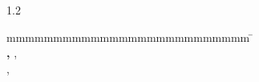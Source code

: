 \begin{titlepage}
	\vfill
	\begin{spacing}{1.2}
	\begin{tabbing}
		mmmmmmmmmmmmmmmmmmmmmmmmmm             \= \kill
		\textbf{\langdbbearbeitungszeit}       \>  \zeitraum\\
		\textbf{\langdbmatriknr, \langdbkurs}  \>  \matrikelnr, \kurs\\
		\textbf{\langdbfirma}                  \>  \firma, \firmenort\\
		\textbf{\langdbbetreuer}               \>  \betreuer\\
		\ifreviewer
			\textbf{\langdbgutachter}              \>  \gutachter\\
		\fi
	\end{tabbing}
	\end{spacing}
\end{titlepage}
